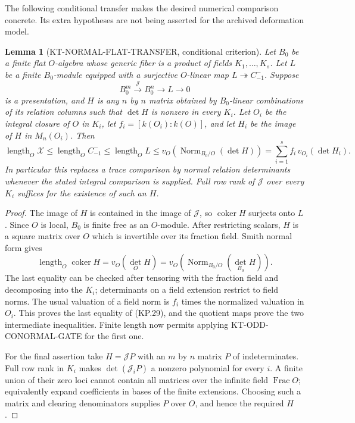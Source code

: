 \documentclass[11pt,a4paper]{article}
\newtheorem{lemma}[theorem]{Lemma}
\theoremstyle{definition}
\begin{document}
The following conditional transfer makes the desired
numerical comparison concrete.  Its extra hypotheses are
not being asserted for the archived deformation model.

\begin{lemma}[KT-NORMAL-FLAT-TRANSFER, conditional criterion]
Let $B_0$ be a finite flat $O$-algebra whose generic fiber
is a product of fields $K_1,\ldots,K_s$.  Let $L$ be a
finite $B_0$-module equipped with a surjective $O$-linear map
$L\twoheadrightarrow C^-_{-1}$.  Suppose
\[
            B_0^m\xrightarrow{\mathcal J} B_0^n
                       \longrightarrow L\longrightarrow0
                                                                  \tag{KP.28}
\]
is a presentation, and $H$ is any $n$ by $n$ matrix obtained
by $B_0$-linear combinations of its relation columns such
that $\det H$ is nonzero in every $K_i$.  Let $O_i$ be the
integral closure of $O$ in $K_i$, let
$f_i=[k(O_i):k(O)]$, and let $H_i$ be the image of $H$ in
$M_n(O_i)$.  Then
\[
 \operatorname{length}_O\mathcal X
 \leq \operatorname{length}_O C^-_{-1}
 \leq \operatorname{length}_O L
 \leq v_O\!\left(\operatorname{Norm}_{B_0/O}(\det H)\right)
 =\sum_{i=1}^s f_i\,v_{O_i}(\det H_i).                      \tag{KP.29}
\]
In particular this replaces a trace comparison by normal
relation determinants whenever the stated integral
comparison is supplied.  Full row rank of $\mathcal J$
over every $K_i$ suffices for the existence of such an $H$.
\end{lemma}
\begin{proof}
The image of $H$ is contained in the image of
$\mathcal J$, so $\operatorname{coker}H$ surjects onto $L$.
Since $O$ is local, $B_0$ is finite free as an $O$-module.
After restricting scalars, $H$ is a square matrix over $O$
which is invertible over its fraction field.  Smith normal
form gives
\[
 \operatorname{length}_O\operatorname{coker}H
     =v_O(\det_O H)
     =v_O\!\left(\operatorname{Norm}_{B_0/O}(\det_{B_0}H)\right).
\]
The last equality can be checked after tensoring with the
fraction field and decomposing into the $K_i$; determinants
on a field extension restrict to field norms.  The usual
valuation of a field norm is $f_i$ times the normalized
valuation in $O_i$.  This proves the last equality of
(KP.29), and the quotient maps prove the two intermediate
inequalities.  Finite length now permits applying
KT-ODD-CONORMAL-GATE for the first one.

For the final assertion take $H=\mathcal J P$ with an
$m$ by $n$ matrix $P$ of indeterminates.  Full row rank in
$K_i$ makes $\det(\mathcal J_iP)$ a nonzero polynomial
for every $i$.  A finite union of their zero loci cannot
contain all matrices over the infinite field
$\operatorname{Frac}O$; equivalently expand coefficients
in bases of the finite extensions.  Choosing such a
matrix and clearing denominators supplies $P$ over $O$,
and hence the required $H$.
\end{proof}
\end{document}
